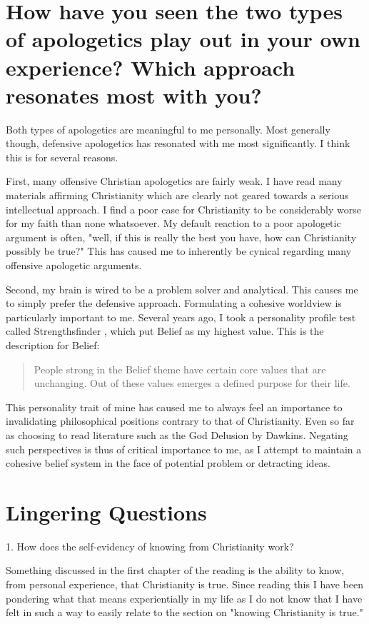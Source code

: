 \documentclass[12pt]{turabian-researchpaper}
\begin{document}
\section{How have you seen the two types of apologetics play out in your own experience? Which approach resonates most with you?}

Both types of apologetics are meaningful to me personally. Most generally though, defensive apologetics has resonated with me most significantly. I think this is for several reasons.

First, many offensive Christian apologetics are fairly weak. I have read many materials affirming Christianity which are clearly not geared towards a serious intellectual approach. I find a poor case for Christianity to be considerably worse for my faith than none whatsoever. My default reaction to a poor apologetic argument is often, "well, if this is really the best you have, how can Christianity possibly be true?" This has caused me to inherently be cynical regarding many offensive apologetic arguments.

Second, my brain is wired to be a problem solver and analytical. This causes me to simply prefer the defensive approach. Formulating a cohesive worldview is particularly important to me. Several years ago, I took a personality profile test called Strengthsfinder \autocite{rath2007strengthsfinder}, which put Belief as my highest value. This is the description for Belief:

\begin{quotation}
People strong in the Belief theme have certain core values that are unchanging. Out
of these values emerges a defined purpose for their life.
\end{quotation}

This personality trait of mine has caused me to always feel an importance to invalidating philosophical positions contrary to that of Christianity. Even so far as choosing to read literature such as the God Delusion by Dawkins. Negating such perspectives is thus of critical importance to me, as I attempt to maintain a cohesive belief system in the face of potential problem or detracting ideas.

\section{Lingering Questions}

1. How does the self-evidency of knowing from Christianity  work?

Something discussed in the first chapter of the reading is the ability to know, from personal experience, that Christianity is true. Since reading this I have been pondering what that means experientially in my life as I do not know that I have felt in such a way to easily relate to the section on "knowing Christianity is true." 
\end{document}
